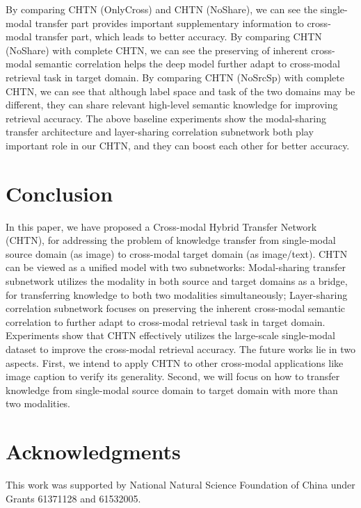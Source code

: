 \documentclass{article}
\begin{document}
By comparing CHTN (OnlyCross) and CHTN (NoShare), we can see the single-modal transfer part provides important supplementary information to cross-modal transfer part, which leads to better accuracy.
By comparing CHTN (NoShare) with complete CHTN, we can see the preserving of inherent cross-modal semantic correlation helps the deep model further adapt to cross-modal retrieval task in target domain. By comparing CHTN (NoSrcSp) with complete CHTN, we can see that although label space and task of the two domains may be different, they can share relevant high-level semantic knowledge for improving retrieval accuracy.
The above baseline experiments show the modal-sharing transfer architecture and layer-sharing correlation subnetwork both play important role in our CHTN, and they can boost each other for better accuracy.


\section{Conclusion}

In this paper, we have proposed a Cross-modal Hybrid Transfer Network (CHTN), for addressing the problem of knowledge transfer from single-modal source domain (as image) to cross-modal target domain (as image/text). CHTN can be viewed as a unified model with two subnetworks: Modal-sharing transfer subnetwork utilizes the modality in both source and target domains as a bridge, for transferring knowledge to both two modalities simultaneously; Layer-sharing correlation subnetwork focuses on preserving the inherent cross-modal semantic correlation to further adapt to cross-modal retrieval task in target domain.
Experiments show that CHTN effectively utilizes the large-scale single-modal dataset to improve the cross-modal retrieval accuracy. 
The future works lie in two aspects. First, we intend to apply CHTN to other cross-modal applications like image caption to verify its generality. Second, we will focus on how to transfer knowledge from single-modal source domain to target domain with more than two modalities. 

\section*{Acknowledgments}
This work was supported by National Natural Science Foundation of China under Grants 61371128 and 61532005.

\appendix




\end{document}

